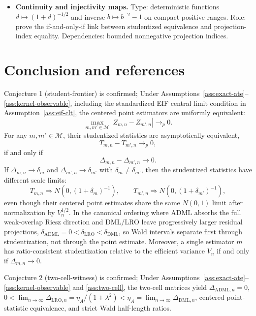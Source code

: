 \documentclass[11pt]{article}
\theoremstyle{definition}
\theoremstyle{plain}
\theoremstyle{remark}
\begin{document}
\begin{itemize}[leftmargin=*]
  \item \textbf{Continuity and injectivity maps.}  Type: deterministic functions \(d\mapsto(1+d)^{-1/2}\) and inverse \(b\mapsto b^{-2}-1\) on compact positive ranges.  Role: prove the if-and-only-if link between studentized equivalence and projection-index equality.  Dependencies: bounded nonnegative projection indices.
\end{itemize}

\section{Conclusion and references}
Conjecture 1 (student-frontier) is confirmed; Under Assumptions~\ref{ass:exact-ate}--\ref{ass:kernel-observable}, including the standardized EIF central limit condition in Assumption~\ref{ass:eif-clt}, the centered point estimators are uniformly equivalent:
\[
  \max_{m,m'\in\mathcal M}|Z_{m,n}-Z_{m',n}|\to_p0.
\]
For any \(m,m'\in\mathcal M\), their studentized statistics are asymptotically equivalent,
\[
  T_{m,n}-T_{m',n}\to_p0,
\]
if and only if
\[
  \Delta_{m,n}-\Delta_{m',n}\to0.
\]
If \(\Delta_{m,n}\to\delta_m\) and \(\Delta_{m',n}\to\delta_{m'}\) with \(\delta_m\ne\delta_{m'}\), then the studentized statistics have different scale limits:
\[
  T_{m,n}\Rightarrow N(0,(1+\delta_m)^{-1}),\qquad
  T_{m',n}\Rightarrow N(0,(1+\delta_{m'})^{-1}),
\]
even though their centered point estimates share the same \(N(0,1)\) limit after normalization by \(V_n^{1/2}\).  In the canonical ordering where ADML absorbs the full weak-overlap Riesz direction and DML/LRO leave progressively larger residual projections, \(\delta_{\mathrm{ADML}}=0<\delta_{\mathrm{LRO}}<\delta_{\mathrm{DML}}\), so Wald intervals separate first through studentization, not through the point estimate.  Moreover, a single estimator \(m\) has ratio-consistent studentization relative to the efficient variance \(V_n\) if and only if \(\Delta_{m,n}\to0\).

Conjecture 2 (two-cell-witness) is confirmed; Under Assumptions~\ref{ass:exact-ate}--\ref{ass:kernel-observable} and \ref{ass:two-cell}, the two-cell matrices yield \(\Delta_{\mathrm{ADML},n}=0\), \(0<\lim_{n\to\infty}\Delta_{\mathrm{LRO},n}=\eta_A/(1+\lambda^2)<\eta_A=\lim_{n\to\infty}\Delta_{\mathrm{DML},n}\), centered point-statistic equivalence, and strict Wald half-length ratios.
\end{document}
